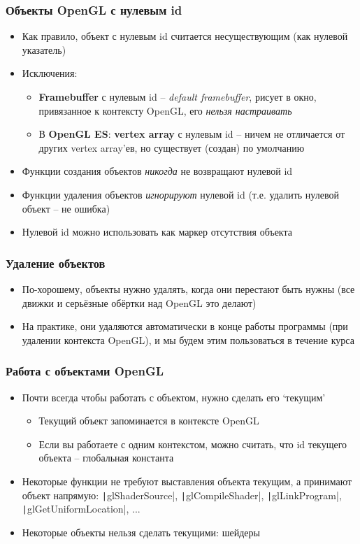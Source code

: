 \documentclass[10pt]{beamer}
\begin{document}
\begin{frame}[fragile]
\frametitle{Объекты OpenGL с нулевым id}
\begin{itemize}
\item Как правило, объект с нулевым id считается несуществующим (как нулевой указатель)
\pause
\item Исключения:
\begin{itemize}
\item \textbf{Framebuffer} с нулевым id -- \textit{default framebuffer}, рисует в окно, привязанное к контексту OpenGL, его \textit{нельзя настраивать}
\pause
\item В \textbf{OpenGL ES}: \textbf{vertex array} с нулевым id -- ничем не отличается от других vertex array'ев, но существует (создан) по умолчанию
\end{itemize}
\pause
\item Функции создания объектов \textit{никогда} не возвращают нулевой id
\item Функции удаления объектов \textit{игнорируют} нулевой id (т.е. удалить нулевой объект -- не ошибка)
\pause
\item Нулевой id можно использовать как маркер отсутствия объекта
\end{itemize}
\end{frame}

\begin{frame}[fragile]
\frametitle{Удаление объектов}
\begin{itemize}
\item По-хорошему, объекты нужно удалять, когда они перестают быть нужны (все движки и серьёзные обёртки над OpenGL это делают)
\pause
\item На практике, они удаляются автоматически в конце работы программы (при удалении контекста OpenGL), и мы будем этим пользоваться в течение курса
\end{itemize}
\end{frame}

\begin{frame}[fragile]
\frametitle{Работа с объектами OpenGL}
\begin{itemize}
\item Почти всегда чтобы работать с объектом, нужно сделать его `текущим'
\begin{itemize}
\item Текущий объект запоминается в контексте OpenGL
\item Если вы работаете с одним контекстом, можно считать, что id текущего объекта -- глобальная константа
\end{itemize}
\pause
\item Некоторые функции не требуют выставления объекта текущим, а принимают объект напрямую: \texttt|glShaderSource|, \texttt|glCompileShader|, \texttt|glLinkProgram|, \texttt|glGetUniformLocation|, ...
\pause
\item Некоторые объекты нельзя сделать текущими: шейдеры
\end{itemize}
\end{frame}
\end{document}
